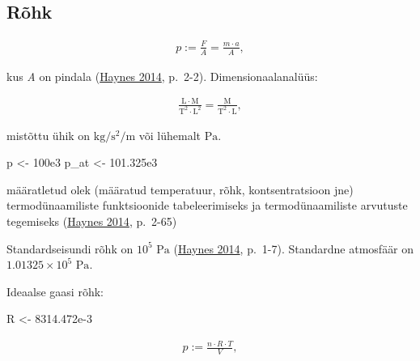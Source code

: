 \documentclass[
  12pt,
  a4paper,
  onecolumn, twoside]{article}
\newenvironment{Shaded}{\begin{snugshade}}{\end{snugshade}}
\newcommand{\FloatTok}[1]{\textcolor[rgb]{0.00,0.00,0.81}{#1}}
\newcommand{\NormalTok}[1]{#1}
\newcommand{\OtherTok}[1]{\textcolor[rgb]{0.56,0.35,0.01}{#1}}
\providecommand{\tightlist}{%
  \setlength{\itemsep}{0pt}\setlength{\parskip}{0pt}}
\begin{document}
\hypertarget{ruxf5hk}{%
\subsection{Rõhk}\label{ruxf5hk}}

\begin{align}
p := \frac{F}{A} = \frac{m \cdot a}{A},
\label{eq:pressure}
\end{align}

kus \emph{A} on pindala (\protect\hyperlink{ref-haynes_2014_crc}{Haynes 2014}, p.~2-2). Dimensionaalanalüüs:

\begin{align}
\mathrm{\frac{L \cdot M}{T^2 \cdot L^2} = \frac{M}{T^2 \cdot L}},
\label{eq:dimensional-analysis-for-pressure}
\end{align}

mistõttu ühik on \(\unit{\kilogram\per\second\squared\per\meter}\) või lühemalt \(\unit{\pascal}\).

\begin{Shaded}
\begin{Highlighting}[numbers=left,,]
\NormalTok{p }\OtherTok{\textless{}{-}} \FloatTok{100e3}
\NormalTok{p\_at }\OtherTok{\textless{}{-}} \FloatTok{101.325e3}
\end{Highlighting}
\end{Shaded}

\begin{description}
\tightlist
\item[standardseisund]
määratletud olek (määratud temperatuur, rõhk, kontsentratsioon jne) termodünaamiliste funktsioonide tabeleerimiseks ja termodünaamiliste arvutuste tegemiseks (\protect\hyperlink{ref-haynes_2014_crc}{Haynes 2014}, p.~2-65)
\end{description}

Standardseisundi rõhk on \ensuremath{10^{5}} \(\unit{\pascal}\) (\protect\hyperlink{ref-haynes_2014_crc}{Haynes 2014}, p.~1-7). Standardne atmosfäär on \ensuremath{1.01325\times 10^{5}} \(\unit{\pascal}\).

Ideaalse gaasi rõhk:

\begin{Shaded}
\begin{Highlighting}[numbers=left,,]
\NormalTok{R }\OtherTok{\textless{}{-}} \FloatTok{8314.472e{-}3}
\end{Highlighting}
\end{Shaded}

\begin{align}
p := \frac{n \cdot R \cdot T}{V},
\label{eq:pressure-of-ideal-gas}
\end{align}
\end{document}
